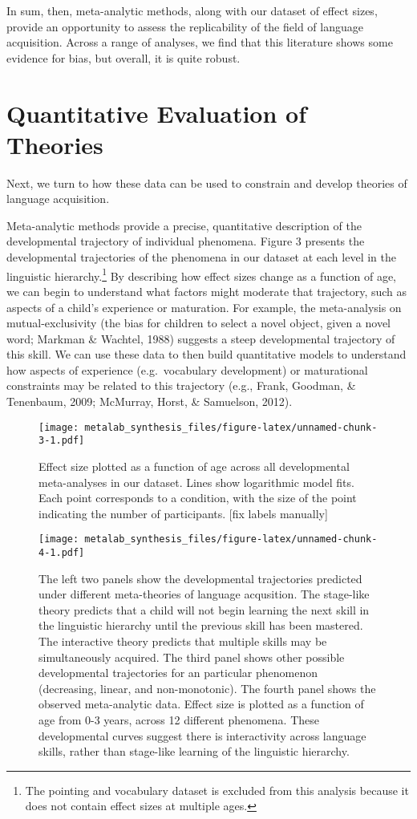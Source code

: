 \documentclass[english,floatsintext,man]{apa6}
\begin{document}
In sum, then, meta-analytic methods, along with our dataset of effect
sizes, provide an opportunity to assess the replicability of the field
of language acquisition. Across a range of analyses, we find that this
literature shows some evidence for bias, but overall, it is quite
robust.

\section{Quantitative Evaluation of
Theories}\label{quantitative-evaluation-of-theories}

Next, we turn to how these data can be used to constrain and develop
theories of language acquisition.

Meta-analytic methods provide a precise, quantitative description of the
developmental trajectory of individual phenomena. Figure 3 presents the
developmental trajectories of the phenomena in our dataset at each level
in the linguistic
hierarchy.\footnote{The pointing and vocabulary dataset is excluded from this analysis because it does not contain effect sizes at multiple ages.}
By describing how effect sizes change as a function of age, we can begin
to understand what factors might moderate that trajectory, such as
aspects of a child's experience or maturation. For example, the
meta-analysis on mutual-exclusivity (the bias for children to select a
novel object, given a novel word; Markman \& Wachtel, 1988) suggests a
steep developmental trajectory of this skill. We can use these data to
then build quantitative models to understand how aspects of experience
(e.g.~vocabulary development) or maturational constraints may be related
to this trajectory (e.g., Frank, Goodman, \& Tenenbaum, 2009; McMurray,
Horst, \& Samuelson, 2012).

\begin{figure}[htbp]
\centering
\texttt{[image: metalab\_synthesis\_files/figure-latex/unnamed-chunk-3-1.pdf]}
\caption{Effect size plotted as a function of age across all
developmental meta-analyses in our dataset. Lines show logarithmic model
fits. Each point corresponds to a condition, with the size of the point
indicating the number of participants. {[}fix labels manually{]}}
\end{figure}

\begin{figure}[htbp]
\centering
\texttt{[image: metalab\_synthesis\_files/figure-latex/unnamed-chunk-4-1.pdf]}
\caption{The left two panels show the developmental trajectories
predicted under different meta-theories of language acqusition. The
stage-like theory predicts that a child will not begin learning the next
skill in the linguistic hierarchy until the previous skill has been
mastered. The interactive theory predicts that multiple skills may be
simultaneously acquired. The third panel shows other possible
developmental trajectories for an particular phenomenon (decreasing,
linear, and non-monotonic). The fourth panel shows the observed
meta-analytic data. Effect size is plotted as a function of age from 0-3
years, across 12 different phenomena. These developmental curves suggest
there is interactivity across language skills, rather than stage-like
learning of the linguistic hierarchy.}
\end{figure}
\end{document}
